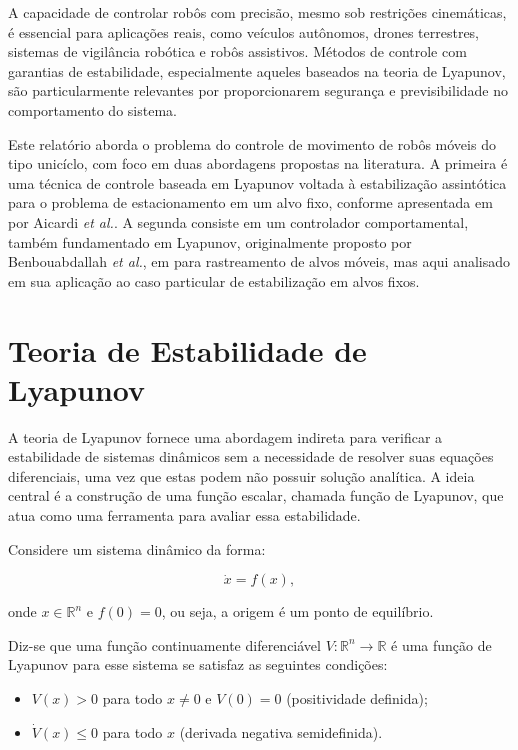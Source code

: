 \documentclass[conference]{IEEEtran}
\begin{document}
A capacidade de controlar robôs com precisão, mesmo sob restrições cinemáticas, é essencial para aplicações reais, como veículos autônomos, drones terrestres, sistemas de vigilância robótica e robôs assistivos. Métodos de controle com garantias de estabilidade, especialmente aqueles baseados na teoria de Lyapunov, são particularmente relevantes por proporcionarem segurança e previsibilidade no comportamento do sistema.

Este relatório aborda o problema do controle de movimento de robôs móveis do tipo unicíclo, com foco em duas abordagens propostas na literatura. A primeira é uma técnica de controle baseada em Lyapunov voltada à estabilização assintótica para o problema de estacionamento em um alvo fixo, conforme apresentada em \cite{b1} por Aicardi \textit{et al.}. A segunda consiste em um controlador comportamental, também fundamentado em Lyapunov, originalmente proposto por Benbouabdallah \textit{et al.}, em \cite{b2} para rastreamento de alvos móveis, mas aqui analisado em sua aplicação ao caso particular de estabilização em alvos fixos.


\section{Teoria de Estabilidade de Lyapunov}

A teoria de Lyapunov fornece uma abordagem indireta para verificar a estabilidade de sistemas dinâmicos sem a necessidade de resolver suas equações diferenciais, uma vez que estas podem não possuir solução analítica. A ideia central é a construção de uma função escalar, chamada função de Lyapunov, que atua como uma ferramenta para avaliar essa estabilidade.

Considere um sistema dinâmico da forma:

\begin{equation}
    \dot{x} = f(x),
    \label{eq:Modelo_Dinamico}
\end{equation}

onde $x \in \mathbb{R}^n$ e $f(0) = 0$, ou seja, a origem é um ponto de equilíbrio.

Diz-se que uma função continuamente diferenciável $V: \mathbb{R}^n \to \mathbb{R}$ é uma função de Lyapunov para esse sistema se satisfaz as seguintes condições:

\begin{itemize}
    \item $V(x) > 0$ para todo $x \neq 0$ e $V(0) = 0$ (positividade definida);
    \item $\dot{V}(x) \leq 0$ para todo $x$ (derivada negativa semidefinida).
\end{itemize}
\end{document}
